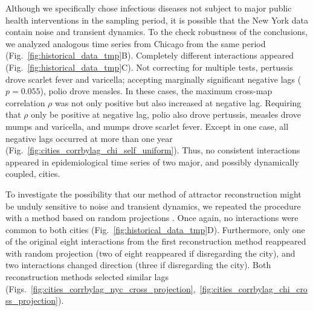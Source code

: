Although we specifically chose infectious diseases not subject to major public health interventions in the sampling period, it is possible that the New York data contain noise and transient dynamics.
To the check robustness of the conclusions, we analyzed analogous time series from Chicago from the same period (Fig.~\ref{fig:historical_data_tmp}B).
Completely different interactions appeared (Fig.~\ref{fig:historical_data_tmp}C).
Not correcting for multiple tests, pertussis drove scarlet fever and varicella; accepting marginally significant negative lags ($p=0.055$), polio drove measles.
In these cases, the maximum cross-map correlation $\rho$ was not only positive but also increased at negative lag.
Requiring that $\rho$ only be positive at negative lag, polio also drove pertussis, measles drove mumps and varicella, and mumps drove scarlet fever.
Except in one case, all negative lags occurred at more than one year (Fig.~\ref{fig:cities_corrbylag_chi_self_uniform}).
Thus, no consistent interactions appeared in epidemiological time series of two major, and possibly dynamically coupled, cities.

To investigate the possibility that our method of attractor reconstruction might be unduly sensitive to noise and transient dynamics, we repeated the procedure with a method based on random projections \cite{Tajima2015}.
Once again, no interactions were common to both cities (Fig.~\ref{fig:historical_data_tmp}D).
Furthermore, only one of the original eight interactions from the first reconstruction method reappeared with random projection (two of eight reappeared if disregarding the city), and two interactions changed direction (three if disregarding the city). 
Both reconstruction methods selected similar lags (Figs.~\ref{fig:cities_corrbylag_nyc_cross_projection},~\ref{fig:cities_corrbylag_chi_cross_projection}).
